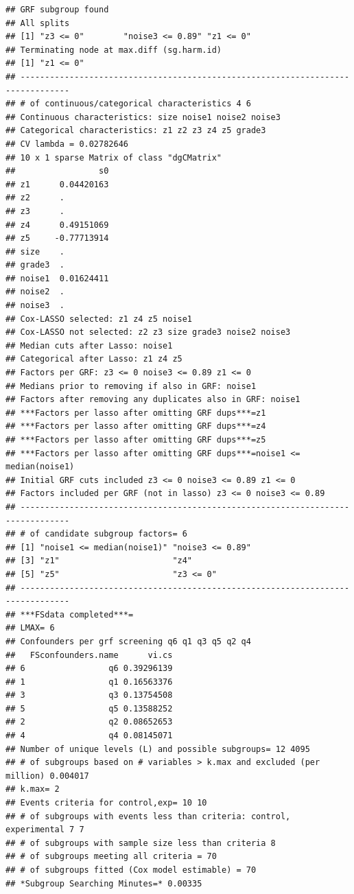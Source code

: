 \documentclass[12pt]{article}
\makeatletter
\newenvironment{kframe}{%
 \def\at@end@of@kframe{}%
 \ifinner\ifhmode%
  \def\at@end@of@kframe{\end{minipage}}%
  \begin{minipage}{\columnwidth}%
 \fi\fi%
 \def\FrameCommand##1{\hskip\@totalleftmargin \hskip-\fboxsep
 \colorbox{shadecolor}{##1}\hskip-\fboxsep
     \hskip-\linewidth \hskip-\@totalleftmargin \hskip\columnwidth}%
 \MakeFramed {\advance\hsize-\width
   \@totalleftmargin\z@ \linewidth\hsize
   \@setminipage}}%
 {\par\unskip\endMakeFramed%
 \at@end@of@kframe}
\newenvironment{knitrout}{}{} %
\makeatother
\begin{document}
\begin{knitrout}
\begin{kframe}
\begin{verbatim}
## GRF subgroup found
## All splits
## [1] "z3 <= 0"        "noise3 <= 0.89" "z1 <= 0"       
## Terminating node at max.diff (sg.harm.id)
## [1] "z1 <= 0"
## --------------------------------------------------------------------------------
## # of continuous/categorical characteristics 4 6 
## Continuous characteristics: size noise1 noise2 noise3 
## Categorical characteristics: z1 z2 z3 z4 z5 grade3 
## CV lambda = 0.02782646 
## 10 x 1 sparse Matrix of class "dgCMatrix"
##                 s0
## z1      0.04420163
## z2      .         
## z3      .         
## z4      0.49151069
## z5     -0.77713914
## size    .         
## grade3  .         
## noise1  0.01624411
## noise2  .         
## noise3  .         
## Cox-LASSO selected: z1 z4 z5 noise1 
## Cox-LASSO not selected: z2 z3 size grade3 noise2 noise3 
## Median cuts after Lasso: noise1 
## Categorical after Lasso: z1 z4 z5 
## Factors per GRF: z3 <= 0 noise3 <= 0.89 z1 <= 0 
## Medians prior to removing if also in GRF: noise1 
## Factors after removing any duplicates also in GRF: noise1 
## ***Factors per lasso after omitting GRF dups***=z1
## ***Factors per lasso after omitting GRF dups***=z4
## ***Factors per lasso after omitting GRF dups***=z5
## ***Factors per lasso after omitting GRF dups***=noise1 <= median(noise1)
## Initial GRF cuts included z3 <= 0 noise3 <= 0.89 z1 <= 0 
## Factors included per GRF (not in lasso) z3 <= 0 noise3 <= 0.89 
## --------------------------------------------------------------------------------
## # of candidate subgroup factors= 6 
## [1] "noise1 <= median(noise1)" "noise3 <= 0.89"          
## [3] "z1"                       "z4"                      
## [5] "z5"                       "z3 <= 0"                 
## --------------------------------------------------------------------------------
## ***FSdata completed***=
## LMAX= 6 
## Confounders per grf screening q6 q1 q3 q5 q2 q4 
##   FSconfounders.name      vi.cs
## 6                 q6 0.39296139
## 1                 q1 0.16563376
## 3                 q3 0.13754508
## 5                 q5 0.13588252
## 2                 q2 0.08652653
## 4                 q4 0.08145071
## Number of unique levels (L) and possible subgroups= 12 4095 
## # of subgroups based on # variables > k.max and excluded (per million) 0.004017 
## k.max= 2 
## Events criteria for control,exp= 10 10 
## # of subgroups with events less than criteria: control, experimental 7 7 
## # of subgroups with sample size less than criteria 8 
## # of subgroups meeting all criteria = 70 
## # of subgroups fitted (Cox model estimable) = 70 
## *Subgroup Searching Minutes=* 0.00335 

\end{verbatim}
\end{kframe}
\end{knitrout}
\end{document}

